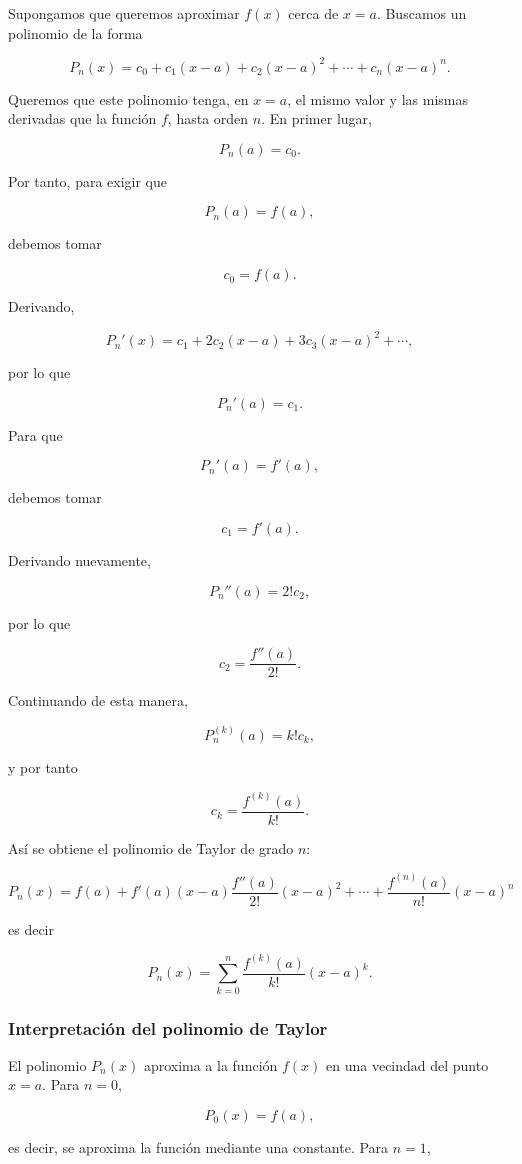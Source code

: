 \documentclass[12pt]{article}
\begin{document}
Supongamos que queremos aproximar \(f(x)\) cerca de \(x=a\). Buscamos un polinomio de la forma

\[P_n(x) =c_0+c_1(x-a)+c_2(x-a)^2+\cdots+c_n(x-a)^n.\]

Queremos que este polinomio tenga, en \(x=a\), el mismo valor y las mismas derivadas que la función \(f\), hasta orden \(n\). En primer lugar,

\[P_n(a)=c_0.\]

Por tanto, para exigir que

\[P_n(a)=f(a),\]

debemos tomar

\[c_0=f(a).\]

Derivando,

\[P_n'(x)=c_1+2c_2(x-a)+3c_3(x-a)^2+\cdots,\]

por lo que

\[P_n'(a)=c_1.\]

Para que

\[P_n'(a)=f'(a),\]

debemos tomar

\[c_1=f'(a).\]

Derivando nuevamente,

\[P_n''(a)=2!c_2,\]

por lo que

\[c_2=\frac{f''(a)}{2!}.\]

Continuando de esta manera,

\[P_n^{(k)}(a)=k!c_k,\]

y por tanto

\[c_k=\frac{f^{(k)}(a)}{k!}.\]

Así se obtiene el polinomio de Taylor de grado \(n\):

\[\boxed{P_n(x)=f(a)+f'(a)(x-a)\frac{f''(a)}{2!}(x-a)^2+\cdots+\frac{f^{(n)}(a)}{n!}(x-a)^n}\]

es decir

\[\boxed{P_n(x)=\sum_{k=0}^{n}\frac{f^{(k)}(a)}{k!}(x-a)^k.}\]
\subsubsection*{Interpretación del polinomio de Taylor}
El polinomio \(P_n(x)\) aproxima a la función \(f(x)\) en una vecindad del punto \(x=a\). Para \(n=0\),

\[P_0(x)=f(a),\]

es decir, se aproxima la función mediante una constante. Para \(n=1\),
\end{document}

